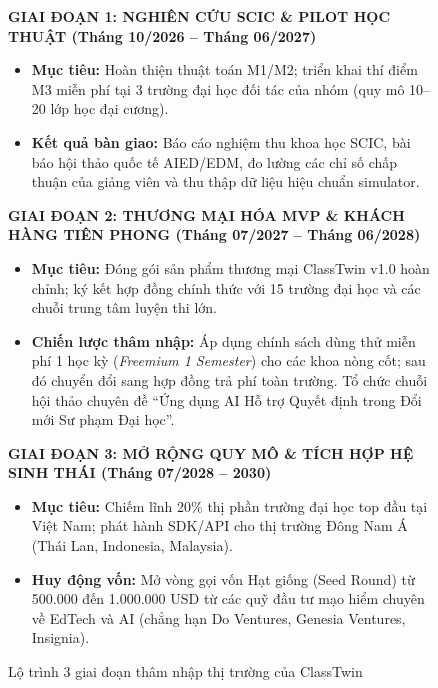 \begin{figure}[htbp]
  \centering
  \begin{tcolorbox}[colback=white, colframe=TealPrimary, boxrule=1pt, arc=3pt, width=0.98\textwidth]
    \small
    \textbf{GIAI ĐOẠN 1: NGHIÊN CỨU SCIC \& PILOT HỌC THUẬT (Tháng 10/2026 -- Tháng 06/2027)}
    \begin{itemize}[leftmargin=1.5em]
      \item \textbf{Mục tiêu:} Hoàn thiện thuật toán M1/M2; triển khai thí điểm M3 miễn phí tại 3 trường đại học đối tác của nhóm (quy mô 10--20 lớp học đại cương).
      \item \textbf{Kết quả bàn giao:} Báo cáo nghiệm thu khoa học SCIC, bài báo hội thảo quốc tế AIED/EDM, đo lường các chỉ số chấp thuận của giảng viên và thu thập dữ liệu hiệu chuẩn simulator.
    \end{itemize}
    \vspace{1mm}
    \textbf{GIAI ĐOẠN 2: THƯƠNG MẠI HÓA MVP \& KHÁCH HÀNG TIÊN PHONG (Tháng 07/2027 -- Tháng 06/2028)}
    \begin{itemize}[leftmargin=1.5em]
      \item \textbf{Mục tiêu:} Đóng gói sản phẩm thương mại ClassTwin v1.0 hoàn chỉnh; ký kết hợp đồng chính thức với 15 trường đại học và các chuỗi trung tâm luyện thi lớn.
      \item \textbf{Chiến lược thâm nhập:} Áp dụng chính sách dùng thử miễn phí 1 học kỳ (\textit{Freemium 1 Semester}) cho các khoa nòng cốt; sau đó chuyển đổi sang hợp đồng trả phí toàn trường. Tổ chức chuỗi hội thảo chuyên đề ``Ứng dụng AI Hỗ trợ Quyết định trong Đổi mới Sư phạm Đại học''.
    \end{itemize}
    \vspace{1mm}
    \textbf{GIAI ĐOẠN 3: MỞ RỘNG QUY MÔ \& TÍCH HỢP HỆ SINH THÁI (Tháng 07/2028 -- 2030)}
    \begin{itemize}[leftmargin=1.5em]
      \item \textbf{Mục tiêu:} Chiếm lĩnh 20\% thị phần trường đại học top đầu tại Việt Nam; phát hành SDK/API cho thị trường Đông Nam Á (Thái Lan, Indonesia, Malaysia).
      \item \textbf{Huy động vốn:} Mở vòng gọi vốn Hạt giống (Seed Round) từ 500.000 đến 1.000.000 USD từ các quỹ đầu tư mạo hiểm chuyên về EdTech và AI (chẳng hạn Do Ventures, Genesia Ventures, Insignia).
    \end{itemize}
  \end{tcolorbox}
  \caption{Lộ trình 3 giai đoạn thâm nhập thị trường của ClassTwin}\label{fig:gtm-roadmap}
\end{figure}

